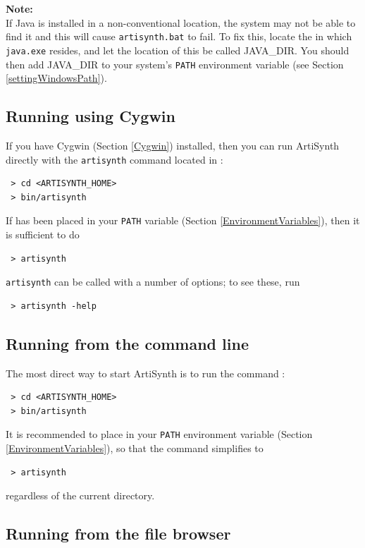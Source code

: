 \begin{sideblock}
{\bf Note:}\\
If Java is installed in a non-conventional location, the system may
not be able to find it and this will cause {\tt artisynth.bat} to fail.
To fix this, locate the \directory{} in which {\tt java.exe} resides, and let
the location of this \directory{} be called JAVA\_DIR. You should then add
JAVA\_DIR to your system's {\tt PATH} environment variable (see
Section \ref{settingWindowsPath}).  
\end{sideblock}

\subsection{Running using Cygwin}

If you have Cygwin (Section \ref{Cygwin}) installed, 
then you can run ArtiSynth directly with the {\tt artisynth} command
located in \ArtHome[/bin]:
\begin{verbatim}
 > cd <ARTISYNTH_HOME>
 > bin/artisynth
\end{verbatim}
If \ArtHome[/bin] has been placed in your {\tt PATH}
variable (Section \ref{EnvironmentVariables}), then it
is sufficient to do
\begin{verbatim}
 > artisynth
\end{verbatim}
{\tt artisynth} can be called with a number of options; to see these, run
\begin{verbatim}
 > artisynth -help
\end{verbatim}

\else
\subsection{Running from the command line}
\label{artisynthCommandLine}

The most direct way to start ArtiSynth is to run the command
:
%
\begin{verbatim}
 > cd <ARTISYNTH_HOME>
 > bin/artisynth
\end{verbatim}
It is recommended to place \ArtHome[/bin] in your {\tt PATH}
environment variable (Section \ref{EnvironmentVariables}), so
that the command simplifies to
\begin{verbatim}
 > artisynth
\end{verbatim}
regardless of the current directory.

\ifMacOS
\subsection{Running from the file browser}

